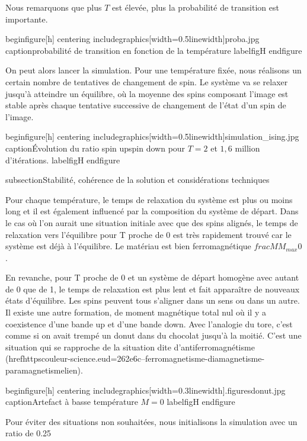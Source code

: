 Nous remarquons que plus $T$ est élevée, plus la probabilité de transition est importante.

begin{figure}[h]
	centering
	includegraphics[width=0.5linewidth]{proba.jpg}
	caption{probabilité de transition en fonction de la température}
	label{figH}
end{figure}

On peut alors lancer la simulation. Pour une température fixée, nous réalisons un certain nombre de tentatives de changement de spin. Le système va se relaxer jusqu'à atteindre un équilibre, où la moyenne des spins composant l'image est stable après chaque tentative successive de changement de l'état d'un spin de l'image.

begin{figure}[h]
centering
includegraphics[width=0.5linewidth]{simulation_ising.jpg}
caption{Évolution du ratio spin upspin down pour $T=2$ et $1,6$ million d'itérations.}
label{figH}
end{figure}

subsection{Stabilité, cohérence de la solution et considérations techniques}

Pour chaque température, le temps de relaxation du système est plus ou moins long et il est également influencé par la composition du système de départ. Dans le cas où l'on aurait une situation initiale avec que des spins alignés, le temps de relaxation vers l'équilibre pour T proche de 0 est très rapidement trouvé car le système est déjà à l'équilibre. Le matériau est bien ferromagnétique  $frac{M}{M_{max}}  0$.

En revanche, pour T proche de 0 et un système de départ homogène avec autant de 0 que de 1, le temps de relaxation est plus lent et fait apparaître de nouveaux états d'équilibre. Les spins peuvent tous s'aligner dans un sens ou dans un autre. Il existe une autre formation, de moment magnétique total nul où il y a coexistence d'une bande up et d'une bande down. Avec l'analogie du tore, c'est comme si on avait trempé un donut dans du chocolat jusqu'à la moitié. C'est une situation qui se rapproche de la situation dite d'antiferromagnétisme (href{httpscouleur-science.eud=262e6c--ferromagnetisme-diamagnetisme-paramagnetisme}{lien}).

begin{figure}[h]
centering
includegraphics[width=0.3linewidth]{.figuresdonut.jpg}
caption{Artefact à basse température $M=0$}
label{figH}
end{figure}

Pour éviter des situations non souhaitées, nous initialisons la simulation avec un ratio de 0.25%

